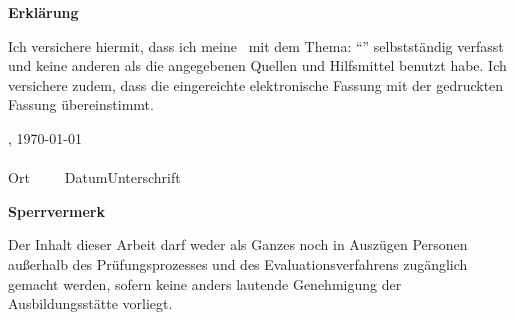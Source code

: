 \newpage
\thispagestyle{empty}

\begin{framed}
    \begin{center}
        \Large\bfseries Erklärung
    \end{center}
    \medskip
    \noindent
    Ich versichere hiermit, dass ich meine \Was\ mit
    dem Thema: \enquote{\Titel} selbstständig verfasst und keine anderen als die angegebenen Quellen und
    Hilfsmittel benutzt habe. Ich versichere zudem, dass die eingereichte elektronische Fassung mit der
    gedruckten Fassung übereinstimmt.

    \vspace{3cm}
    \noindent
    \FirmenStadt, \today\\
    \underline{\hspace{4cm}}\hfill\underline{\hspace{6cm}}\\
    Ort~~~~~Datum\hfill Unterschrift\hspace{3.82cm}
\end{framed}

\vfill

\begin{framed}
    \begin{center}
        \Large\bfseries Sperrvermerk
    \end{center}
    \medskip
    \noindent
    Der Inhalt dieser Arbeit darf weder als Ganzes noch in Auszügen Personen
    außerhalb des Prüfungsprozesses und des Evaluationsverfahrens zugänglich gemacht
    werden, sofern keine anders lautende Genehmigung der Ausbildungsstätte vorliegt.
\end{framed}